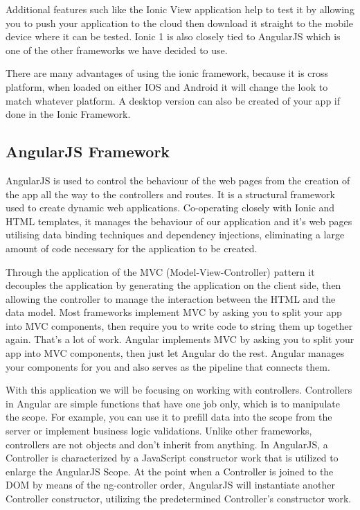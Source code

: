 Additional features such like the Ionic View application help to test it by allowing you to push your application to the cloud then download it straight to the mobile device where it can be tested. Ionic 1 is also closely tied to AngularJS which is one of the other frameworks we have decided to use.

There are many advantages of using the ionic framework, because it is cross platform, when loaded on either IOS and Android it will change the look to match whatever platform. A desktop version can also be created of your app if done in the Ionic Framework.

\subsection{AngularJS Framework}
AngularJS is used to control the behaviour of the web pages from the creation of the app all the way to the controllers and routes. It is a structural framework used to create dynamic web applications. Co-operating closely with Ionic and HTML templates, it manages the behaviour of our application and it's web pages utilising data binding techniques and dependency injections, eliminating a large amount of code necessary for the application to be created.

Through the application of the MVC (Model-View-Controller) pattern it decouples the application by generating the application on the client side,
then allowing the controller to manage the interaction between the HTML and the data model. Most frameworks implement MVC by asking you to split your app into MVC components, then require you to write code to string them up together again.\cite{angular} That’s a lot of work. Angular implements MVC by asking you to split your app into MVC components, then just let Angular do the rest. Angular manages your components for you and also serves as the pipeline that connects them.\cite{angular}

With this application we will be focusing on working with controllers. Controllers in Angular are simple functions that have one job only, which is to manipulate the scope.\cite{angular} For example, you can use it to prefill data into the scope from the server or implement business logic validations.\cite{angular} Unlike other frameworks, controllers are not objects and don’t inherit from anything.\cite{angular} In AngularJS, a Controller is characterized by a JavaScript constructor work that is utilized to enlarge the AngularJS Scope. At the point when a Controller is joined to the DOM by means of the ng-controller order, AngularJS will instantiate another Controller constructor, utilizing the predetermined Controller's constructor work.

